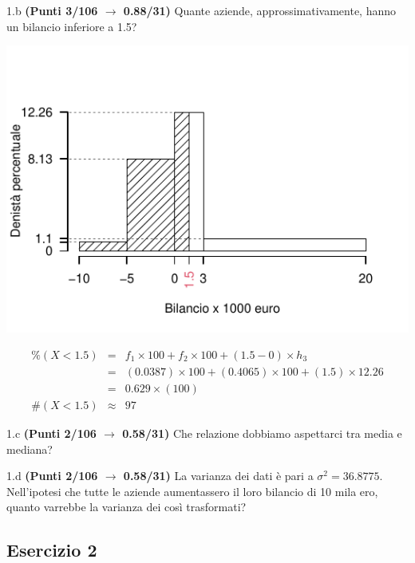 \documentclass[
  11pt,
]{book}
\theoremstyle{mytheoremstyle}
\theoremstyle{mydefstyle}
\newenvironment{sol}
  {
  \begin{tcolorbox}[enhanced,breakable,arc=0.1mm,boxrule=1pt,colback=white,colframe=iblue,
  title=\bf \fontfamily{lmss}\selectfont \hspace{.5 cm} Soluzione,drop fuzzy shadow]

}{
\end{tcolorbox}
  }
\begin{document}
1.b \textbf{(Punti 3/106 \(\rightarrow\) 0.88/31)} Quante aziende, approssimativamente, hanno un bilancio inferiore a 1.5?

\begin{sol}

\begin{center}\includegraphics{Esami_passati_con_soluzioni_files/figure-latex/2021-34,-1} \end{center}

\begin{eqnarray*}
     \%(X< 1.5 ) &=&  f_{ 1 }\times 100+f_{ 2 }\times 100 +( 1.5 - 0 )\times h_{ 3 } \\
              &=&  ( 0.0387 )\times 100+( 0.4065 )\times 100 +( 1.5 )\times  12.26  \\
              &=&  0.629 \times(100) \\
     \#(X< 1.5 ) &\approx& 97 
         \end{eqnarray*}

\end{sol}

1.c \textbf{(Punti 2/106 \(\rightarrow\) 0.58/31)} Che relazione dobbiamo aspettarci tra media e mediana?

1.d \textbf{(Punti 2/106 \(\rightarrow\) 0.58/31)} La varianza dei dati è pari a \(\sigma^2=36.8775\). Nell'ipotesi che tutte le aziende aumentassero il loro bilancio di 10 mila ero, quanto varrebbe la varianza dei così trasformati?

\subsection{Esercizio 2}\label{esercizio-2-10}
\end{document}
